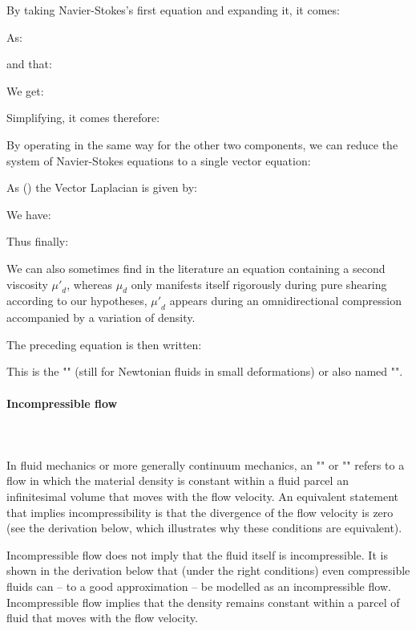	By taking Navier-Stokes's first equation and expanding it, it comes:
	
	As:
	
	and that:
	
	We get:
	
	Simplifying, it comes therefore:
	
	By operating in the same way for the other two components, we can reduce the system of Navier-Stokes equations to a single vector equation:
	
	As () the Vector Laplacian is given by:
	
	We have:
	
	Thus finally:
	
	\begin{tcolorbox}[title=Remark,colframe=black,arc=10pt]
	We can also sometimes find in the literature an equation containing a second viscosity ${\mu'}_d$, whereas $\mu_d$ only manifests itself rigorously during pure shearing according to our hypotheses, ${\mu'}_d$ appears during an omnidirectional compression accompanied by a variation of density.
	\end{tcolorbox}
	The preceding equation is then written:
	
	This is the "" (still for Newtonian fluids in small deformations) or also named "".
	
	\paragraph{Incompressible flow}\mbox{}\\\\
	In fluid mechanics or more generally continuum mechanics, an "" or "" refers to a flow in which the material density is constant within a fluid parcel an infinitesimal volume that moves with the flow velocity. An equivalent statement that implies incompressibility is that the divergence of the flow velocity is zero (see the derivation below, which illustrates why these conditions are equivalent).

	Incompressible flow does not imply that the fluid itself is incompressible. It is shown in the derivation below that (under the right conditions) even compressible fluids can – to a good approximation – be modelled as an incompressible flow. Incompressible flow implies that the density remains constant within a parcel of fluid that moves with the flow velocity.
	
